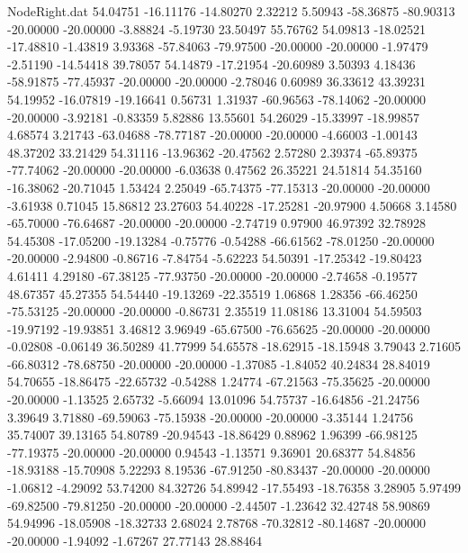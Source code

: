 \begin{filecontents}{NodeRight.dat}
  54.04751  -16.11176  -14.80270     2.32212    5.50943  -58.36875  -80.90313  -20.00000  -20.00000   -3.88824   -5.19730   23.50497   55.76762
  54.09813  -18.02521  -17.48810    -1.43819    3.93368  -57.84063  -79.97500  -20.00000  -20.00000   -1.97479   -2.51190  -14.54418   39.78057
  54.14879  -17.21954  -20.60989     3.50393    4.18436  -58.91875  -77.45937  -20.00000  -20.00000   -2.78046    0.60989   36.33612   43.39231
  54.19952  -16.07819  -19.16641     0.56731    1.31937  -60.96563  -78.14062  -20.00000  -20.00000   -3.92181   -0.83359    5.82886   13.55601
  54.26029  -15.33997  -18.99857     4.68574    3.21743  -63.04688  -78.77187  -20.00000  -20.00000   -4.66003   -1.00143   48.37202   33.21429
  54.31116  -13.96362  -20.47562     2.57280    2.39374  -65.89375  -77.74062  -20.00000  -20.00000   -6.03638    0.47562   26.35221   24.51814
  54.35160  -16.38062  -20.71045     1.53424    2.25049  -65.74375  -77.15313  -20.00000  -20.00000   -3.61938    0.71045   15.86812   23.27603
  54.40228  -17.25281  -20.97900     4.50668    3.14580  -65.70000  -76.64687  -20.00000  -20.00000   -2.74719    0.97900   46.97392   32.78928
  54.45308  -17.05200  -19.13284    -0.75776   -0.54288  -66.61562  -78.01250  -20.00000  -20.00000   -2.94800   -0.86716   -7.84754   -5.62223
  54.50391  -17.25342  -19.80423     4.61411    4.29180  -67.38125  -77.93750  -20.00000  -20.00000   -2.74658   -0.19577   48.67357   45.27355
  54.54440  -19.13269  -22.35519     1.06868    1.28356  -66.46250  -75.53125  -20.00000  -20.00000   -0.86731    2.35519   11.08186   13.31004
  54.59503  -19.97192  -19.93851     3.46812    3.96949  -65.67500  -76.65625  -20.00000  -20.00000   -0.02808   -0.06149   36.50289   41.77999
  54.65578  -18.62915  -18.15948     3.79043    2.71605  -66.80312  -78.68750  -20.00000  -20.00000   -1.37085   -1.84052   40.24834   28.84019
  54.70655  -18.86475  -22.65732    -0.54288    1.24774  -67.21563  -75.35625  -20.00000  -20.00000   -1.13525    2.65732   -5.66094   13.01096
  54.75737  -16.64856  -21.24756     3.39649    3.71880  -69.59063  -75.15938  -20.00000  -20.00000   -3.35144    1.24756   35.74007   39.13165
  54.80789  -20.94543  -18.86429     0.88962    1.96399  -66.98125  -77.19375  -20.00000  -20.00000    0.94543   -1.13571    9.36901   20.68377
  54.84856  -18.93188  -15.70908     5.22293    8.19536  -67.91250  -80.83437  -20.00000  -20.00000   -1.06812   -4.29092   53.74200   84.32726
  54.89942  -17.55493  -18.76358     3.28905    5.97499  -69.82500  -79.81250  -20.00000  -20.00000   -2.44507   -1.23642   32.42748   58.90869
  54.94996  -18.05908  -18.32733     2.68024    2.78768  -70.32812  -80.14687  -20.00000  -20.00000   -1.94092   -1.67267   27.77143   28.88464

\end{filecontents}
